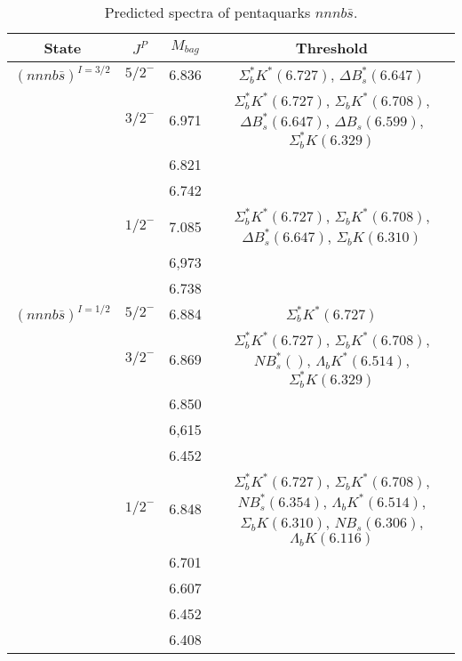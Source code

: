 \documentclass[prd,twocolumn,floatfix,nofootinbib]{revtex4}
\begin{document}
\renewcommand{\tabcolsep}{0.5cm}
\renewcommand{\arraystretch}{1.2}
\begin{table*}[!htbp]
    \caption{Predicted spectra of pentaquarks $nnnb\bar{s}$.}
    \begin{tabular}{cccc}
        \hline\hline
        {\rm State} &$J^{P}$ &$M_{bag}$ &Threshold \\ \hline
        ${(nnnb\bar{s})}^{I=3/2}$
            &${5/2}^{-}$    &6.836  &$\Sigma_{b}^{\ast}K^{\ast}(6.727)$, $\Delta B_{s}^{\ast}(6.647)$ \\
            &${3/2}^{-}$    &6.971  &$\Sigma_{b}^{\ast}K^{\ast}(6.727)$, $\Sigma_{b}K^{\ast}(6.708)$, $\Delta B_{s}^{\ast}(6.647)$, $\Delta B_{s}(6.599)$, $\Sigma_{b}^{\ast}K(6.329)$ \\
            &               &6.821  & \\
            &               &6.742  & \\
            &${1/2}^{-}$    &7.085  &$\Sigma_{b}^{\ast}K^{\ast}(6.727)$, $\Sigma_{b}K^{\ast}(6.708)$, $\Delta B_{s}^{\ast}(6.647)$, $\Sigma_{b}K(6.310)$ \\
            &               &6,973  & \\
            &               &6.738  & \\
        ${(nnnb\bar{s})}^{I=1/2}$
            &${5/2}^{-}$    &6.884  &$\Sigma_{b}^{\ast}K^{\ast}(6.727)$ \\
            &${3/2}^{-}$    &6.869  &$\Sigma_{b}^{\ast}K^{\ast}(6.727)$, $\Sigma_{b}K^{\ast}(6.708)$, $NB_{s}^{\ast}()$, $\Lambda_{b}K^{\ast}(6.514)$, $\Sigma_{b}^{\ast}K(6.329)$ \\
            &               &6.850  & \\
            &               &6,615  & \\
            &               &6.452  & \\
            &${1/2}^{-}$    &6.848  &$\Sigma_{b}^{\ast}K^{\ast}(6.727)$, $\Sigma_{b}K^{\ast}(6.708)$, $NB_{s}^{\ast}(6.354)$, $\Lambda_{b}K^{\ast}(6.514)$, $\Sigma_{b}K(6.310)$, $NB_{s}(6.306)$, $\Lambda_{b}K(6.116)$ \\
            &               &6.701  & \\
            &               &6.607  & \\
            &               &6.452  & \\
            &               &6.408  & \\
        \hline\hline
    \end{tabular}
\end{table*}
\end{document}
